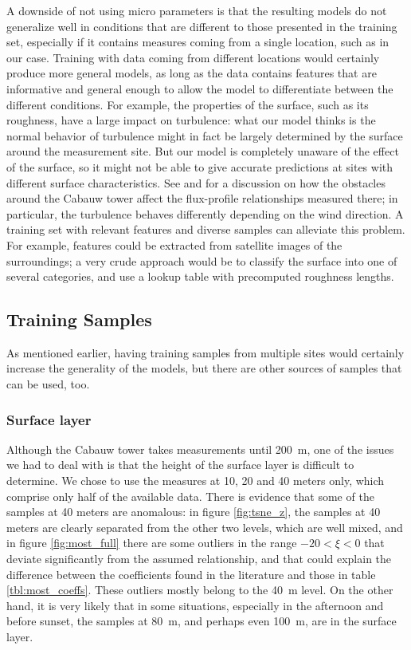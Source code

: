 \documentclass[a4paper,11pt]{kth-mag}
\begin{document}
A downside of not using micro parameters is that the resulting models do not generalize well in conditions that are different to those presented in the training set, especially if it contains measures coming from a single location, such as in our case. Training with data coming from different locations would certainly produce more general models, as long as the data contains features that are informative and general enough to allow the model to differentiate between the different conditions. For example, the properties of the surface, such as its roughness, have a large impact on turbulence: what our model thinks is the normal behavior of turbulence might in fact be largely determined by the surface around the measurement site. But our model is completely unaware of the effect of the surface, so it might not be able to give accurate predictions at sites with different surface characteristics. See \cite{cabauw_surface} and \cite{cabauw_z0} for a discussion on how the obstacles around the Cabauw tower affect the flux-profile relationships measured there; in particular, the turbulence behaves differently depending on the wind direction. A training set with relevant features and diverse samples can alleviate this problem. For example, features could be extracted from satellite images of the surroundings; a very crude approach would be to classify the surface into one of several categories, and use a lookup table with precomputed roughness lengths.


\subsection{Training Samples}
As mentioned earlier, having training samples from multiple sites would certainly increase the generality of the models, but there are other sources of samples that can be used, too.

\subsubsection{Surface layer} Although the Cabauw tower takes measurements until \SI{200}{\meter}, one of the issues we had to deal with is that the height of the surface layer is difficult to determine. We chose to use the measures at 10, 20 and 40 meters only, which comprise only half of the available data. There is evidence that some of the samples at 40 meters are anomalous: in figure \ref{fig:tsne_z}, the samples at 40 meters are clearly separated from the other two levels, which are well mixed, and in figure \ref{fig:most_full} there are some outliers in the range $-20<\xi<0$ that deviate significantly from the assumed relationship, and that could explain the difference between the coefficients found in the literature and those in table \ref{tbl:most_coeffs}. These outliers mostly belong to the \SI{40}{\meter} level. On the other hand, it is very likely that in some situations, especially in the afternoon and before sunset, the samples at \SI{80}{\meter}, and perhaps even \SI{100}{\meter}, are in the surface layer.
\end{document}

